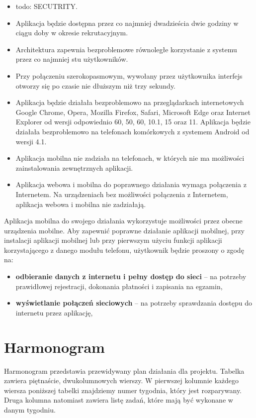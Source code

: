 \documentclass{article}
\begin{document}
\begin{itemize}
	\item todo: SECUTRITY.
	\item Aplikacja będzie dostępna przez co najmniej dwadzieścia dwie godziny w ciągu doby w okresie rekrutacyjnym.
	\item Architektura zapewnia bezproblemowe równoległe korzystanie z systemu przez co najmniej stu użytkowników.
	\item Przy połączeniu szerokopasmowym, wywołany przez użytkownika interfejs otworzy się po czasie nie dłuższym niż trzy sekundy. 
	\item Aplikacja będzie działała bezproblemowo na przeglądarkach internetowych Google Chrome, Opera, Mozilla Firefox, Safari, Microsoft Edge oraz Internet Explorer od wersji odpowiednio 60, 50, 60, 10.1, 15 oraz 11. Aplikacja będzie działała bezproblemowo na telefonach komórkowych z systemem Android od wersji 4.1.
	\item Aplikacja mobilna nie zadziała na telefonach, w których nie ma możliwości zainstalowania zewnętrznych aplikacji.
	\item Aplikacja webowa i mobilna do poprawnego działania wymaga połączenia z Internetem. Na urządzeniach bez możliwości połączenia z Internetem, aplikacja webowa i mobilna nie zadziałają.
\end{itemize}

Aplikacja mobilna do swojego działania wykorzystuje możliwości przez obecne urządzenia mobilne. Aby zapewnić poprawne działanie aplikacji mobilnej, przy instalacji aplikacji mobilnej lub przy pierwszym użyciu funkcji aplikacji korzystającego z danego modułu telefonu, użytkownik będzie proszony o zgodę na:
\begin{itemize}
	\item \textbf{odbieranie danych z internetu i pełny dostęp do sieci} – na potrzeby prawidłowej rejestracji, dokonania płatności i zapisania na egzamin,
	\item \textbf{wyświetlanie połączeń sieciowych} – na potrzeby sprawdzania dostępu do internetu przez aplikację,
\end{itemize}

\section{Harmonogram}

Harmonogram przedstawia przewidywany plan działania dla projektu. Tabelka zawiera piętnaście, dwukolumnowych wierszy. W pierwszej kolumnie każdego wiersza poniższej tabelki znajdziemy numer tygodnia, który jest rozparywany. Druga kolumna natomiast zawiera listę zadań, które mają być wykonane w danym tygodniu.
\end{document}
